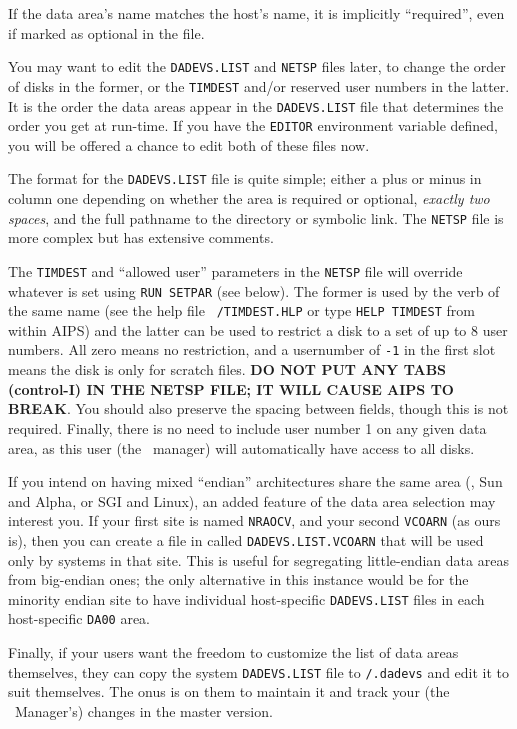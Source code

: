 If the data area's name matches the host's name, it is implicitly
``required'', even if marked as optional in the file.

You may want to edit the {\tt DADEVS.LIST} and {\tt NETSP} files later,
to change the order of disks in the former, or the {\tt TIMDEST} and/or
reserved user numbers in the latter.  It is the order the data areas
appear in the {\tt DADEVS.LIST} file that determines the order you get
at run-time.  If you have the {\tt EDITOR} environment variable defined,
you will be offered a chance to edit both of these files now.

The format for the {\tt DADEVS.LIST} file is quite simple; either a plus
or minus in column one depending on whether the area is required or
optional, {\it exactly two spaces\/}, and the full pathname to the
directory or symbolic link.  The {\tt NETSP} file is more complex but
has extensive comments.

The {\tt TIMDEST} and ``allowed user'' parameters in the {\tt NETSP}
file will override whatever is set using {\tt RUN SETPAR} (see below).
The former is used by the verb of the same name (see the help file {\tt
\HLPFIL/TIMDEST.HLP} or type {\tt HELP TIMDEST} from within AIPS) and
the latter can be used to restrict a disk to a set of up to 8 user
numbers.  All zero means no restriction, and a usernumber of {\tt -1} in
the first slot means the disk is only for scratch files.  {\bf DO NOT
PUT ANY TABS (control-I) IN THE NETSP FILE; IT WILL CAUSE AIPS TO
BREAK}.  You should also preserve the spacing between fields, though
this is not required.  Finally, there is no need to include user number
1 on any given data area, as this user (the \AIPS\ manager) will
automatically have access to all disks.

If you intend on having mixed ``endian'' architectures share the same
{\tt\AROOT} area (\eg, Sun and Alpha, or SGI and Linux), an added
feature of the data area selection may interest you.  If your first site
is named {\tt NRAOCV}, and your second {\tt VCOARN} (as ours is), then
you can create a file in {\tt{}} called {\tt DADEVS.LIST.VCOARN} that
will be used only by systems in that site.  This is useful for
segregating little-endian data areas from big-endian ones; the only
alternative in this instance would be for the minority endian site to
have individual host-specific {\tt DADEVS.LIST} files in each
host-specific {\tt DA00} area.

Finally, if your users want the freedom to customize the list of data
areas themselves, they can copy the system {\tt DADEVS.LIST} file to
{\tt\HOME/.dadevs} and edit it to suit themselves.  The onus is on them
to maintain it and track your (the \AIPS\ Manager's) changes in the
master version.

